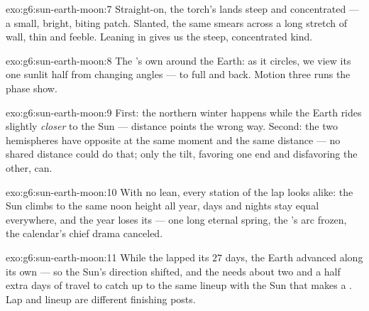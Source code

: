 \begin{solution}{exo:g6:sun-earth-moon:7}
Straight-on, the torch's  lands steep and concentrated ---
a small, bright, biting patch. Slanted, the same  smears
across a long stretch of wall, thin and feeble. Leaning in gives
us the steep, concentrated kind.
\end{solution}

\begin{solution}{exo:g6:sun-earth-moon:8}
The 's own  around the Earth: as it circles, we view its
one sunlit half from changing angles ---  to full and
back. Motion three runs the phase show.
\end{solution}

\begin{solution}{exo:g6:sun-earth-moon:9}
First: the northern winter happens while the Earth rides slightly
\emph{closer} to the Sun --- distance points the wrong way.
Second: the two hemispheres have opposite  at the same
moment and the same distance --- no shared distance could do
that; only the tilt, favoring one end and disfavoring the other,
can.
\end{solution}

\begin{solution}{exo:g6:sun-earth-moon:10}
With no lean, every station of the lap looks alike: the Sun
climbs to the same noon height all year, days and nights stay
equal everywhere, and the year loses its  --- one long
eternal spring, the 's arc frozen, the calendar's chief
drama canceled.
\end{solution}

\begin{solution}{exo:g6:sun-earth-moon:11}
While the  lapped its $27$ days, the Earth advanced along its
own  --- so the Sun's direction shifted, and the  needs
about two and a half extra days of travel to catch up to the same
lineup with the Sun that makes a . Lap and lineup are
different finishing posts.
\end{solution}

